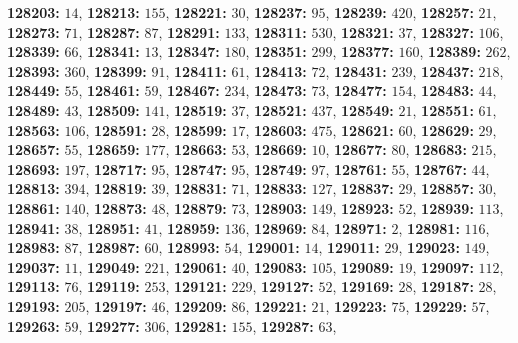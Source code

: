\textsf{\bfseries 128203:} $14$, \textsf{\bfseries 128213:} $155$, \textsf{\bfseries 128221:} $30$, \textsf{\bfseries 128237:} $95$, \textsf{\bfseries 128239:} $420$, \textsf{\bfseries 128257:} $21$, \textsf{\bfseries 128273:} $71$, \textsf{\bfseries 128287:} $87$, \textsf{\bfseries 128291:} $133$, \textsf{\bfseries 128311:} $530$, \textsf{\bfseries 128321:} $37$, \textsf{\bfseries 128327:} $106$, \textsf{\bfseries 128339:} $66$, \textsf{\bfseries 128341:} $13$, \textsf{\bfseries 128347:} $180$, \textsf{\bfseries 128351:} $299$, \textsf{\bfseries 128377:} $160$, \textsf{\bfseries 128389:} $262$, \textsf{\bfseries 128393:} $360$, \textsf{\bfseries 128399:} $91$, \textsf{\bfseries 128411:} $61$, \textsf{\bfseries 128413:} $72$, \textsf{\bfseries 128431:} $239$, \textsf{\bfseries 128437:} $218$, \textsf{\bfseries 128449:} $55$, \textsf{\bfseries 128461:} $59$, \textsf{\bfseries 128467:} $234$, \textsf{\bfseries 128473:} $73$, \textsf{\bfseries 128477:} $154$, \textsf{\bfseries 128483:} $44$, \textsf{\bfseries 128489:} $43$, \textsf{\bfseries 128509:} $141$, \textsf{\bfseries 128519:} $37$, \textsf{\bfseries 128521:} $437$, \textsf{\bfseries 128549:} $21$, \textsf{\bfseries 128551:} $61$, \textsf{\bfseries 128563:} $106$, \textsf{\bfseries 128591:} $28$, \textsf{\bfseries 128599:} $17$, \textsf{\bfseries 128603:} $475$, \textsf{\bfseries 128621:} $60$, \textsf{\bfseries 128629:} $29$, \textsf{\bfseries 128657:} $55$, \textsf{\bfseries 128659:} $177$, \textsf{\bfseries 128663:} $53$, \textsf{\bfseries 128669:} $10$, \textsf{\bfseries 128677:} $80$, \textsf{\bfseries 128683:} $215$, \textsf{\bfseries 128693:} $197$, \textsf{\bfseries 128717:} $95$, \textsf{\bfseries 128747:} $95$, \textsf{\bfseries 128749:} $97$, \textsf{\bfseries 128761:} $55$, \textsf{\bfseries 128767:} $44$, \textsf{\bfseries 128813:} $394$, \textsf{\bfseries 128819:} $39$, \textsf{\bfseries 128831:} $71$, \textsf{\bfseries 128833:} $127$, \textsf{\bfseries 128837:} $29$, \textsf{\bfseries 128857:} $30$, \textsf{\bfseries 128861:} $140$, \textsf{\bfseries 128873:} $48$, \textsf{\bfseries 128879:} $73$, \textsf{\bfseries 128903:} $149$, \textsf{\bfseries 128923:} $52$, \textsf{\bfseries 128939:} $113$, \textsf{\bfseries 128941:} $38$, \textsf{\bfseries 128951:} $41$, \textsf{\bfseries 128959:} $136$, \textsf{\bfseries 128969:} $84$, \textsf{\bfseries 128971:} $2$, \textsf{\bfseries 128981:} $116$, \textsf{\bfseries 128983:} $87$, \textsf{\bfseries 128987:} $60$, \textsf{\bfseries 128993:} $54$, \textsf{\bfseries 129001:} $14$, \textsf{\bfseries 129011:} $29$, \textsf{\bfseries 129023:} $149$, \textsf{\bfseries 129037:} $11$, \textsf{\bfseries 129049:} $221$, \textsf{\bfseries 129061:} $40$, \textsf{\bfseries 129083:} $105$, \textsf{\bfseries 129089:} $19$, \textsf{\bfseries 129097:} $112$, \textsf{\bfseries 129113:} $76$, \textsf{\bfseries 129119:} $253$, \textsf{\bfseries 129121:} $229$, \textsf{\bfseries 129127:} $52$, \textsf{\bfseries 129169:} $28$, \textsf{\bfseries 129187:} $28$, \textsf{\bfseries 129193:} $205$, \textsf{\bfseries 129197:} $46$, \textsf{\bfseries 129209:} $86$, \textsf{\bfseries 129221:} $21$, \textsf{\bfseries 129223:} $75$, \textsf{\bfseries 129229:} $57$, \textsf{\bfseries 129263:} $59$, \textsf{\bfseries 129277:} $306$, \textsf{\bfseries 129281:} $155$, \textsf{\bfseries 129287:} $63$, 
